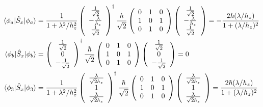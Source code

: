\documentclass[10pt]{article}
\newcommand{\1}{\mathbf 1}
\begin{document}
\begin{align}
	\braket{\phi_a|\hat S_x | \phi_a}
	&=
	\frac{1}{1+\lambda^2/h_z^2}
	\left(
\begin{array}{c}
 \frac{1}{\sqrt{2}} \\
 -\frac{\lambda }{h_z} \\
 \frac{1}{\sqrt{2}} \\
\end{array}
\right)^\dagger
\frac{\hbar}{\sqrt{2}}
\left(
\begin{array}{ccc}
 0 & 1 & 0 \\
 1 & 0 & 1 \\
 0 & 1 & 0 \\
\end{array}
\right)
		\left(
\begin{array}{c}
 \frac{1}{\sqrt{2}} \\
 -\frac{\lambda }{h_z} \\
 \frac{1}{\sqrt{2}} \\
\end{array}
\right)
=
-
\frac
{2 \hbar (\lambda/h_z)}
{1+(\lambda/h_z)^2}
\\
\braket{\phi_b|\hat S_x | \phi_b}
&=
\left(
\begin{array}{c}
\frac{1}{\sqrt{2}} \\
0\\
-\frac{1}{\sqrt{2}} \\
\end{array}
\right)^\dagger
\frac{\hbar}{\sqrt{2}}
\left(
\begin{array}{ccc}
0 & 1 & 0 \\
1 & 0 & 1 \\
0 & 1 & 0 \\
\end{array}
\right)
	\left(
\begin{array}{c}
\frac{1}{\sqrt{2}} \\
0 \\
-\frac{1}{\sqrt{2}} \\
\end{array}
\right)
=
0
\\
\braket{\phi_3 | \hat S_x | \phi_3}
&=
\frac{1}{1+\lambda^2/h_z^2}
\left(
\begin{array}{c}
 \frac{\lambda }{\sqrt{2} h_z} \\
 1 \\
 \frac{\lambda }{\sqrt{2} h_z} \\
\end{array}
\right)^\dagger
\frac{\hbar}{\sqrt{2}}
\left(
\begin{array}{ccc}
0 & 1 & 0 \\
1 & 0 & 1 \\
0 & 1 & 0 \\
\end{array}
\right)
\left(
\begin{array}{c}
 \frac{\lambda }{\sqrt{2} h_z} \\
 1 \\
 \frac{\lambda }{\sqrt{2} h_z} \\
\end{array}
\right)
=
\frac
{2 \hbar (\lambda/h_z)}
{1+(\lambda/h_z)^2}
\end{align}
\end{document}
